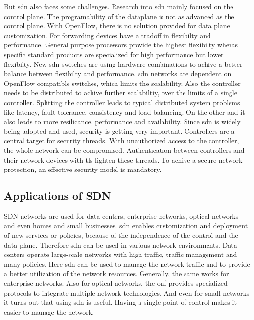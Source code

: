 \documentclass[conference]{IEEEtran}
\begin{document}
	But \ac{sdn} also faces some challenges. Research into \ac{sdn} mainly focused on the control plane. The programability of the dataplane is not as advanced as the control plane. With OpenFlow, there is no solution provided for data plane customization. \cite{MASOUDI20161}
	For forwarding devices have a tradoff in flexibilty and performance. General purpose processors provide the highest flexibilty wheras specific standard products are specialized for high performance but lower flexibilty. \cite{Jefia2018-pj}New \ac{sdn} switches are using hardware combinations to achive a better balance between flexibilty and performance.  \cite{MASOUDI20161}
	\ac{sdn} networks are dependent on OpenFlow compatible switches, which limits the scalability. Also the controller needs to be distributed to achive further scalabiltiy, over the limits of a single controller. Splitting the controller leads to typical distributed system problems like latency, fault tolerance, consistency and load balancing. On the other and it also leads to more resilicance, performance and availability. \cite{MASOUDI20161} 
	Since \ac{sdn} is widely being adopted and used, security is getting very important. Controllers are a central target for security threads. With unauthorized access to the controller, the whole network can be compromised. Authentication between controllers and their network devices with \ac{tls} lighten these threads. To achive a secure network protection, an effective security model is mandatory. \cite{Jefia2018-pj}


	\subsection{Applications of SDN}

	SDN networks are used for data centers, enterprise networks, optical networks and even homes and small businesses. \ac{sdn} enables customization and deployment of new services or policies, because of the independence of the control and the data plane. Therefore \ac{sdn} can be used in various network environments. Data centers operate large-scale networks with high traffic, traffic management and many policies. Here \ac{sdn} can be used to manage the network traffic and to provide a better utilization of the network resources. Generally, the same works for enterprise networks. Also for optical networks, the \ac{onf} provides specialized protocols to integrate multiple network technologies. And even for small networks it turns out that using \ac{sdn} is useful. Having a single point of control makes it easier to manage the network. \cite{Jefia2018-pj} 
\end{document}
